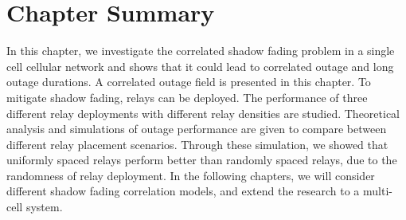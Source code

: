 \section{Chapter Summary}
\label{sec:Conclusions}
In this chapter, we investigate the correlated shadow fading problem in a single cell cellular network and shows that it could lead to correlated outage and long outage durations. A correlated outage field is presented in this chapter. To mitigate shadow fading, relays can be deployed. The performance of three different relay deployments with different relay densities are studied. Theoretical analysis and simulations of outage performance are given to compare between different relay placement scenarios. Through these simulation, we showed that uniformly spaced relays perform better than randomly spaced relays, due to the randomness of relay deployment. In the following chapters, we will consider different shadow fading correlation models, and extend the research to a multi-cell system. 





